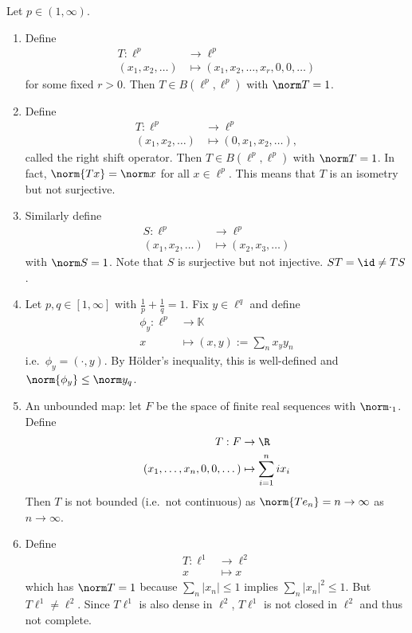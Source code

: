 \documentclass[a4paper]{article}
\newcommand{\K}{{\mathbb{K}}} %
\begin{document}
\begin{eg}
  Let \(p \in (1, \infty)\).
  \begin{enumerate}
  \item Define
    \begin{align*}
      T: \ell^p &\to \ell^p \\
      (x_1, x_2, \dots) &\mapsto (x_1, x_2, \dots, x_r, 0, 0, \dots)
    \end{align*}
    for some fixed \(r > 0\). Then \(T \in B(\ell^p, \ell^p)\) with \(\norm T = 1\).
  \item Define
    \begin{align*}
      T: \ell^p &\to \ell^p \\
      (x_1, x_2, \dots) &\mapsto (0, x_1, x_2, \dots ),
    \end{align*}
    called the right shift operator. Then \(T \in B(\ell^p, \ell^p)\) with \(\norm T = 1\). In fact, \(\norm{Tx} = \norm x\) for all \(x \in \ell^p\). This means that \(T\) is an isometry but not surjective.
  \item Similarly define
    \begin{align*}
      S: \ell^p &\to \ell^p \\
      (x_1, x_2, \dots) &\mapsto (x_2, x_3, \dots)
    \end{align*}
    with \(\norm S = 1\). Note that \(S\) is surjective but not injective. \(ST = \id \neq TS\).
  \item Let \(p, q \in [1, \infty]\) with \(\frac{1}{p} + \frac{1}{q} = 1\). Fix \(y \in \ell^q\) and define
    \begin{align*}
      \phi_y: \ell^p & \to \K \\
      x &\mapsto (x, y) := \sum_{n} x_yy_n
    \end{align*}
    i.e.\ \(\phi_y = (\cdot, y)\). By Hölder's inequality, this is well-defined and \(\norm{\phi_y} \leq \norm y_q\).
  \item An unbounded map: let \(F\) be the space of finite real sequences with \(\norm \cdot_1\). Define
    \begin{align*}
      T: F &\to \R \\
      (x_1, \dots, x_n, 0, 0, \dots) &\mapsto \sum_{i = 1}^n i x_i
    \end{align*}
    Then \(T\) is not bounded (i.e.\ not continuous) as \(\norm{T e_n} = n \to \infty\) as \(n \to \infty\).
  \item Define
    \begin{align*}
      T: \ell^1 &\to \ell^2 \\
      x &\mapsto x
    \end{align*}
    which has \(\norm T = 1\) because \(\sum_n |x_n| \leq 1\) implies \(\sum_n |x_n|^2 \leq 1\). But \(T\ell^1 \neq \ell^2\). Since \(T\ell^1\) is also dense in \(\ell^2\), \(T\ell^1\) is not closed in \(\ell^2\) and thus not complete.
  \end{enumerate}
\end{eg}
\end{document}
